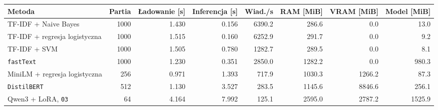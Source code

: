 \begin{tabular}{lrrrrrrr}
\hline
\textbf{Metoda} & \textbf{Partia} & \textbf{Ładowanie [s]} & \textbf{Inferencja [s]} & \textbf{Wiad./s} & \textbf{RAM [MiB]} & \textbf{VRAM [MiB]} & \textbf{Model [MiB]} \\
\hline
TF-IDF + Naive Bayes & 1000 & 1.430 & 0.156 & 6390.2 & 286.6 & 0.0 & 13.0 \\
TF-IDF + regresja logistyczna & 1000 & 1.515 & 0.160 & 6252.9 & 291.7 & 0.0 & 9.2 \\
TF-IDF + SVM & 1000 & 1.505 & 0.780 & 1282.7 & 289.5 & 0.0 & 8.1 \\
\texttt{fastText} & 1000 & 1.230 & 0.351 & 2850.0 & 1282.2 & 0.0 & 980.3 \\
MiniLM + regresja logistyczna & 256 & 0.971 & 1.393 & 717.9 & 1030.3 & 1266.2 & 87.3 \\
\texttt{DistilBERT} & 512 & 1.130 & 3.527 & 283.5 & 1145.6 & 8846.6 & 256.1 \\
Qwen3 + LoRA, \texttt{03} & 64 & 4.164 & 7.992 & 125.1 & 2595.0 & 2787.2 & 1525.9 \\
\hline
\end{tabular}
